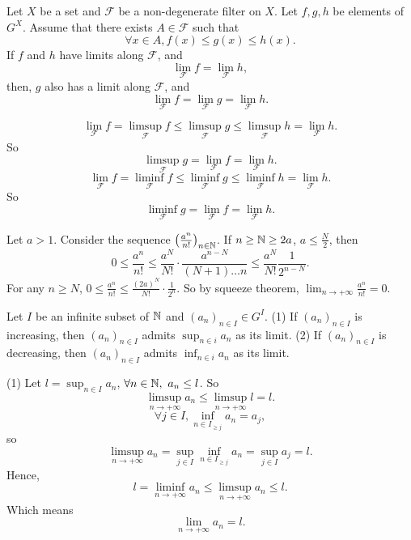 \begin{theoremenv}
    Let $X$ be a set and $\mathcal{F}$ be a non-degenerate filter on $X$. Let $f,g,h$ be elements of $G^X$. Assume that there exists $A\in \mathcal{F}$ such that 
    $$\forall x\in A, f(x)\le g(x)\le h(x).$$
    If $f$ and $h$ have limits along $\mathcal{F}$, and 
    $$\lim_{\mathcal{F}}f=\lim_{\mathcal{F}}h,$$
    then, $g$ also has a limit along $\mathcal{F}$, and 
    $$\lim_{\mathcal{F}}f=\lim_{\mathcal{F}}g=\lim_{\mathcal{F}}h.$$
\end{theoremenv}
\begin{proofenv}
    $$\lim_{\mathcal{F}}f=\limsup_{\mathcal{F}}f\le \limsup_{\mathcal{F}}g\le \limsup_{\mathcal{F}}h=\lim_{\mathcal{F}}h.$$
    So 
    $$\limsup_{\mathcal{F}} g=\lim_{\mathcal{F}}f=\lim_{\mathcal{F}}h.$$
    $$\lim_{\mathcal{F}}f=\liminf_{\mathcal{F}}f\le \liminf_{\mathcal{F}}g\le \liminf_{\mathcal{F}}h=\lim_{\mathcal{F}}h.$$
    So 
    $$\liminf_{\mathcal{F}} g=\lim_{\mathcal{F}}f=\lim_{\mathcal{F}}h.$$
\end{proofenv}
\begin{exampleenv}
    Let $a>1$. Consider the sequence $\left(\frac{a^n}{n!}\right)_{n\in \mathbb{N}}$. If $n\ge \mathbb{N}\ge 2a $, $a\le \frac{N}{2}$, then 
    $$0\le \frac{a^n}{n!}\le \frac{a^N}{N!}\cdot\frac{a^{n-N}}{(N+1)\dots n}\le \frac{a^N}{N!}\frac{1}{2^{n-N}}.$$
    For any $n\ge N$, $0\le \frac{a^n}{n!}\le \frac{(2a)^N}{N!}\cdot \frac{1}{2^n}.$ So by squeeze theorem, $\displaystyle\lim_{n\rightarrow+\infty}\frac{a^n}{n!}=0$.
\end{exampleenv}
\begin{theoremenv}
    Let $I$ be an infinite subset of $\mathbb{N}$ and $(a_n)_{n\in I}\in G^I$.
    \newline
    (1) If $(a_n)_{n\in I}$ is increasing, then $(a_n)_{n\in I}$ admits $\displaystyle \sup_{n\in i}a_n$ as its limit.
    \newline
    (2) If $(a_n)_{n\in I}$ is decreasing, then $(a_n)_{n\in I}$ admits $\displaystyle \inf_{n\in i}a_n$ as its limit.
    
\end{theoremenv}
\begin{proofenv}
    \quad\newline
    (1) Let $l=\sup_{n\in I} a_n$, $\forall n\in \mathbb{N},\ a_n\le l$. So 
    $$\limsup_{n\rightarrow +\infty}a_n\le\limsup_{n\rightarrow +\infty}l=l.$$
    $$\forall j\in I, \inf_{n\in I_{\ge j}}a_n=a_j,$$
    so $$\limsup_{n\rightarrow+\infty}a_n=\sup_{j\in I}\inf_{n\in I_{\ge j}}a_n=\sup_{j\in I}a_j=l.$$
    Hence,
    $$l=\liminf_{n\rightarrow+\infty}a_n\le \limsup_{n\rightarrow+\infty}a_n\le l .$$
    Which means 
    $$\lim_{n\rightarrow +\infty}a_n=l.$$
\end{proofenv}
